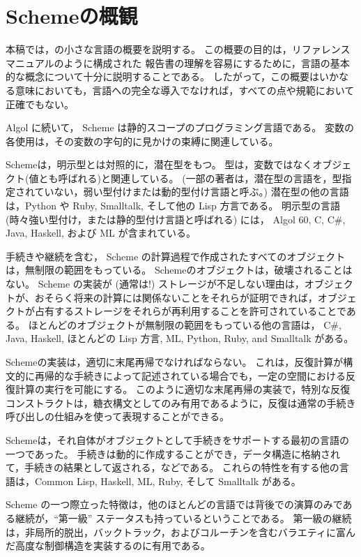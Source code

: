 \chapter*{Schemeの概観}

本稿では，\rsevenrs の小さな言語の概要を説明する。
この概要の目的は，リファレンスマニュアルのように構成された \rsevenrs{} 報告書の理解を容易にするために，言語の基本的な概念について十分に説明することである。
したがって，この概要はいかなる意味においても，言語への完全な導入でなければ，すべての点や規範において正確でもない。

\vest Algol に続いて， Scheme は静的スコープのプログラミング言語である。
変数の各使用は，その変数の字句的に見かけの束縛に関連している。

\vest Schemeは，明示型とは対照的に，潜在型をもつ。
型は，変数ではなくオブジェクト(値とも呼ばれる)と関連している。
(一部の著者は，潜在型の言語を，型指定されていない，弱い型付けまたは動的型付け言語と呼ぶ。)
潜在型の他の言語は，Python や Ruby, Smalltalk, そして他の Lisp 方言である。
明示型の言語 (時々強い型付け，または静的型付け言語と呼ばれる) には， Algol 60, C, C\#, Java, Haskell, および ML が含まれている。

\vest 手続きや継続を含む， Scheme の計算過程で作成されたすべてのオブジェクトは，無制限の範囲をもっている。
Schemeのオブジェクトは，破壊されることはない。
Scheme の実装が (通常は!) ストレージが不足しない理由は，オブジェクトが、おそらく将来の計算には関係ないことをそれらが証明できれば，オブジェクトが占有するストレージをそれらが再利用することを許可されていることである。
ほとんどのオブジェクトが無制限の範囲をもっている他の言語は， C\#, Java, Haskell, ほとんどの Lisp 方言, ML, Python, Ruby, and Smalltalk がある。

Schemeの実装は，適切に末尾再帰でなければならない。
これは，反復計算が構文的に再帰的な手続きによって記述されている場合でも，一定の空間における反復計算の実行を可能にする。
このように適切な末尾再帰の実装で，特別な反復コンストラクトは，糖衣構文としてのみ有用であるように，反復は通常の手続き呼び出しの仕組みを使って表現することができる。

\vest Schemeは，それ自体がオブジェクトとして手続きをサポートする最初の言語の一つであった。
手続きは動的に作成することができ，データ構造に格納されて，手続きの結果として返される，などである。
これらの特性を有する他の言語は，Common Lisp, Haskell, ML, Ruby, そして Smalltalk がある。

\vest Scheme の一つ際立った特徴は，他のほとんどの言語では背後での演算のみである継続が，``第一級'' ステータスも持っているということである。
第一級の継続は，非局所的脱出，バックトラック，およびコルーチンを含むバラエティに富んだ高度な制御構造を実装するのに有用である。

